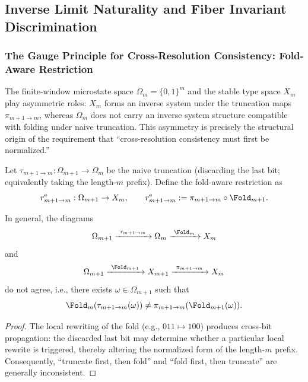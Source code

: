 \subsection{Inverse Limit Naturality and Fiber Invariant Discrimination}\label{subsec:pom-new-results}
\subsubsection{The Gauge Principle for Cross-Resolution Consistency: Fold-Aware Restriction}\label{subsubsec:pom-gauge}
The finite-window microstate space $\Omega_m=\{0,1\}^m$ and the stable type space $X_m$ play asymmetric roles: $X_m$ forms an inverse system under the truncation maps $\pi_{m+1\to m}$, whereas $\Omega_m$ does not carry an inverse system structure compatible with folding under naive truncation. This asymmetry is precisely the structural origin of the requirement that ``cross-resolution consistency must first be normalized.''

\begin{definition}\label{def:pom-fold-aware-restriction}
Let $\tau_{m+1\to m}:\Omega_{m+1}\to\Omega_m$ be the naive truncation (discarding the last bit; equivalently taking the length-$m$ prefix). Define the fold-aware restriction as
$$
r^{\mathrm{e}}_{m+1\to m}:\Omega_{m+1}\to X_m,
\qquad
r^{\mathrm{e}}_{m+1\to m}:=\pi_{m+1\to m}\circ\Fold_{m+1}.
$$
\end{definition}

\begin{proposition}\label{prop:pom-truncation-not-commute}
In general, the diagrams
$$
\Omega_{m+1}\xrightarrow{\ \tau_{m+1\to m}\ }\Omega_m\xrightarrow{\ \Fold_m\ }X_m
$$
and
$$
\Omega_{m+1}\xrightarrow{\ \Fold_{m+1}\ }X_{m+1}\xrightarrow{\ \pi_{m+1\to m}\ }X_m
$$
do not agree, i.e., there exists $\omega\in\Omega_{m+1}$ such that
$$
\Fold_m(\tau_{m+1\to m}(\omega))\neq \pi_{m+1\to m}(\Fold_{m+1}(\omega)).
$$
\end{proposition}
\begin{proof}
The local rewriting of the fold (e.g., $011\mapsto 100$) produces cross-bit propagation: the discarded last bit may determine whether a particular local rewrite is triggered, thereby altering the normalized form of the length-$m$ prefix. Consequently, ``truncate first, then fold'' and ``fold first, then truncate'' are generally inconsistent.
\end{proof}

